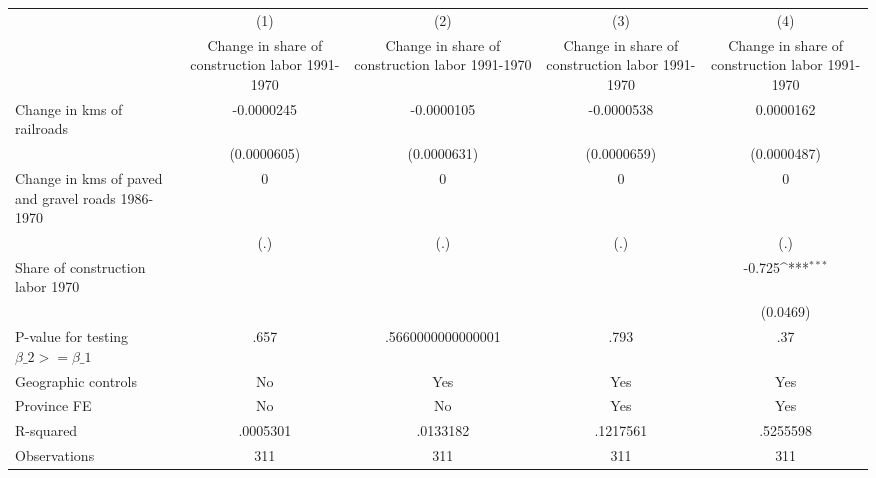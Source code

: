 {
\def\sym#1{\ifmmode^{#1}\else\(^{#1}\)\fi}
\begin{tabular}{l*{4}{c}}
\hline\hline
                &\multicolumn{1}{c}{(1)}&\multicolumn{1}{c}{(2)}&\multicolumn{1}{c}{(3)}&\multicolumn{1}{c}{(4)}\\
                &\multicolumn{1}{c}{Change in share of construction labor 1991-1970}&\multicolumn{1}{c}{Change in share of construction labor 1991-1970}&\multicolumn{1}{c}{Change in share of construction labor 1991-1970}&\multicolumn{1}{c}{Change in share of construction labor 1991-1970}\\
\hline
Change in kms of railroads&-0.0000245         &-0.0000105         &-0.0000538         &0.0000162         \\
                &(0.0000605)         &(0.0000631)         &(0.0000659)         &(0.0000487)         \\
[1em]
Change in kms of paved and gravel roads 1986-1970&        0         &        0         &        0         &        0         \\
                &      (.)         &      (.)         &      (.)         &      (.)         \\
[1em]
Share of construction labor 1970&                  &                  &                  &   -0.725\sym{***}\\
                &                  &                  &                  & (0.0469)         \\
\hline
P-value for testing $\beta\_{2} >= \beta\_{1}$&     .657         &.5660000000000001         &     .793         &      .37         \\
Geographic controls&       No         &      Yes         &      Yes         &      Yes         \\
Province FE     &       No         &       No         &      Yes         &      Yes         \\
R-squared       & .0005301         & .0133182         & .1217561         & .5255598         \\
Observations    &      311         &      311         &      311         &      311         \\
\hline\hline
\end{tabular}
}
